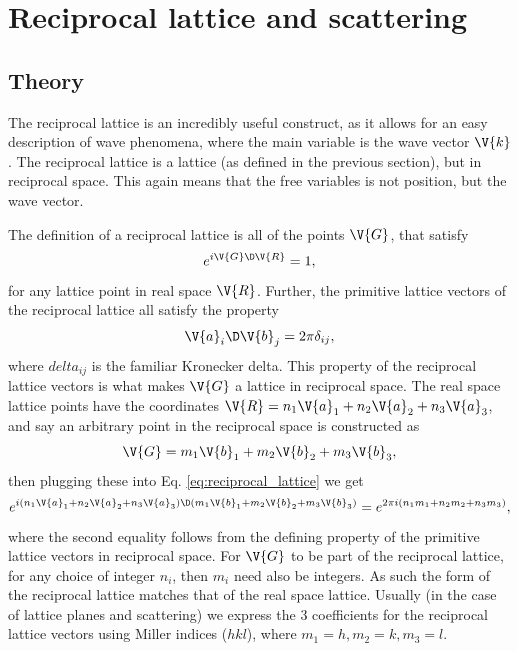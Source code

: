 \documentclass[main.tex]{subfiles}
\begin{document}
	\section{Reciprocal lattice and scattering} \label{sec:scattering}
	\subsection{Theory}
	The reciprocal lattice is an incredibly useful construct, as it allows for an easy description of wave phenomena, where the main variable is the wave vector $ \V{k} $. The reciprocal lattice is a lattice (as defined in the previous section), but in reciprocal space. This again means that the free variables is not position, but the wave vector.
	
	The definition of a reciprocal lattice is all of the points $ \V{G} $, that satisfy
	\begin{equation}\label{eq:reciprocal_lattice}
		e^{i \V{G} \D \V{R}} = 1,
	\end{equation}
	for any lattice point in real space $ \V{R} $. Further, the primitive lattice vectors of the reciprocal lattice all satisfy the property
	\begin{equation}\label{eq:rec_prim_def}
		\V{a}_i \D \V{b}_j = 2\pi \delta_{ij},
	\end{equation}
	where $ delta_{ij} $ is the familiar Kronecker delta. This property of the reciprocal lattice vectors is what makes $ \V{G} $ a lattice in reciprocal space. The real space lattice points have the coordinates $ \V{R} = n_1 \V{a}_1 + n_2 \V{a}_2 + n_3 \V{a}_3 $, and say an arbitrary point in the reciprocal space is constructed as
	\begin{equation}\label{eq:rec_lat_vec}
		\V{G} = m_1 \V{b}_1 + m_2 \V{b}_2 + m_3 \V{b}_3,
	\end{equation}
	then plugging these into Eq. \eqref{eq:reciprocal_lattice} we get
	\begin{equation}
		e^{i (n_1 \V{a}_1 + n_2 \V{a}_2 + n_3 \V{a}_3) \D (m_1 \V{b}_1 + m_2 \V{b}_2 + m_3 \V{b}_3)} = e^{2\pi i (n_1 m_1 + n_2 m_2 + n_3 m_3)},
	\end{equation}
	where the second equality follows from the defining property of the primitive lattice vectors in reciprocal space. For $ \V{G} $ to be part of the reciprocal lattice, for any choice of integer $ n_i $, then $ m_i $ need also be integers. As such the form of the reciprocal lattice matches that of the real space lattice. Usually (in the case of lattice planes and scattering) we express the 3 coefficients for the reciprocal lattice vectors using Miller indices ($ hkl $), where $ m_1=h, m_2 = k, m_3 = l $.
	
\end{document}
